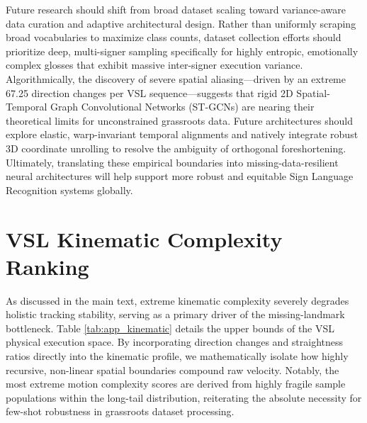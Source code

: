 \documentclass{ieeeaccess}
\begin{document}
Future research should shift from broad dataset scaling toward variance-aware data curation and adaptive architectural design. Rather than uniformly scraping broad vocabularies to maximize class counts, dataset collection efforts should prioritize deep, multi-signer sampling specifically for highly entropic, emotionally complex glosses that exhibit massive inter-signer execution variance. Algorithmically, the discovery of severe spatial aliasing—driven by an extreme 67.25 direction changes per VSL sequence—suggests that rigid 2D Spatial-Temporal Graph Convolutional Networks (ST-GCNs) are nearing their theoretical limits for unconstrained grassroots data. Future architectures should explore elastic, warp-invariant temporal alignments and natively integrate robust 3D coordinate unrolling to resolve the ambiguity of orthogonal foreshortening. Ultimately, translating these empirical boundaries into missing-data-resilient neural architectures will help support more robust and equitable Sign Language Recognition systems globally.

\appendices

\section{VSL Kinematic Complexity Ranking}
As discussed in the main text, extreme kinematic complexity severely degrades holistic tracking stability, serving as a primary driver of the missing-landmark bottleneck. Table \ref{tab:app_kinematic} details the upper bounds of the VSL physical execution space. By incorporating direction changes and straightness ratios directly into the kinematic profile, we mathematically isolate how highly recursive, non-linear spatial boundaries compound raw velocity. Notably, the most extreme motion complexity scores are derived from highly fragile sample populations within the long-tail distribution, reiterating the absolute necessity for few-shot robustness in grassroots dataset processing.
\end{document}
